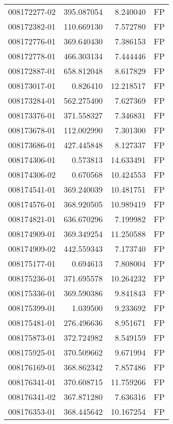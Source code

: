 \begin{tabular}{lrrl}
008172277-02 &  395.087054 &       8.240040 &   FP \\
008172382-01 &  110.669130 &       7.572780 &   FP \\
008172776-01 &  369.640430 &       7.386153 &   FP \\
008172778-01 &  466.303134 &       7.444446 &   FP \\
008172887-01 &  658.812048 &       8.617829 &   FP \\
008173017-01 &    0.826410 &      12.218517 &   FP \\
008173284-01 &  562.275400 &       7.627369 &   FP \\
008173376-01 &  371.558327 &       7.346831 &   FP \\
008173678-01 &  112.002990 &       7.301300 &   FP \\
008173686-01 &  427.445848 &       8.127337 &   FP \\
008174306-01 &    0.573813 &      14.633491 &   FP \\
008174306-02 &    0.670568 &      10.424553 &   FP \\
008174541-01 &  369.240039 &      10.481751 &   FP \\
008174576-01 &  368.920505 &      10.989419 &   FP \\
008174821-01 &  636.670296 &       7.199982 &   FP \\
008174909-01 &  369.349254 &      11.250588 &   FP \\
008174909-02 &  442.559343 &       7.173740 &   FP \\
008175177-01 &    0.694613 &       7.808004 &   FP \\
008175236-01 &  371.695578 &      10.264232 &   FP \\
008175336-01 &  369.590386 &       9.841843 &   FP \\
008175399-01 &    1.039500 &       9.233692 &   FP \\
008175481-01 &  276.496636 &       8.951671 &   FP \\
008175873-01 &  372.724982 &       8.549159 &   FP \\
008175925-01 &  370.509662 &       9.671994 &   FP \\
008176169-01 &  368.862342 &       7.857486 &   FP \\
008176341-01 &  370.608715 &      11.759266 &   FP \\
008176341-02 &  367.871280 &       7.636316 &   FP \\
008176353-01 &  368.445642 &      10.167254 &   FP \\

\end{tabular}
